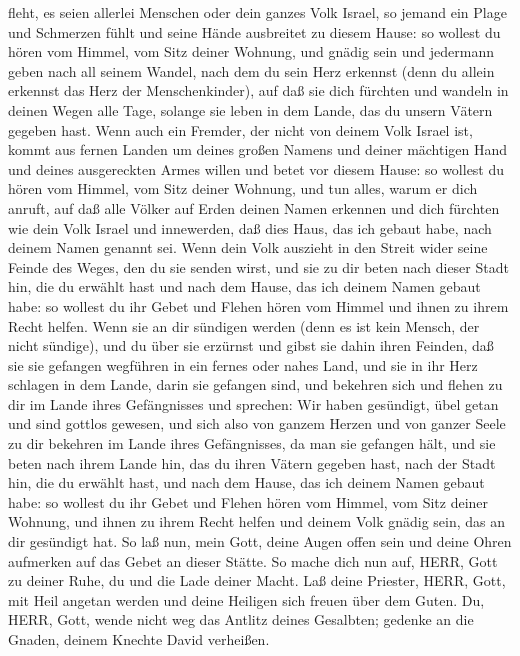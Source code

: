 fleht, es seien allerlei Menschen oder dein ganzes Volk Israel, so
jemand ein Plage und Schmerzen fühlt und seine Hände ausbreitet zu
diesem Hause:  so wollest du hören vom Himmel, vom Sitz
deiner Wohnung, und gnädig sein und jedermann geben nach all seinem
Wandel, nach dem du sein Herz erkennst (denn du allein erkennst das Herz
der Menschenkinder),  auf daß sie dich fürchten und wandeln
in deinen Wegen alle Tage, solange sie leben in dem Lande, das du unsern
Vätern gegeben hast.  Wenn auch ein Fremder, der nicht von
deinem Volk Israel ist, kommt aus fernen Landen um deines großen Namens
und deiner mächtigen Hand und deines ausgereckten Armes willen und betet
vor diesem Hause:  so wollest du hören vom Himmel, vom Sitz
deiner Wohnung, und tun alles, warum er dich anruft, auf daß alle Völker
auf Erden deinen Namen erkennen und dich fürchten wie dein Volk Israel
und innewerden, daß dies Haus, das ich gebaut habe, nach deinem Namen
genannt sei.  Wenn dein Volk auszieht in den Streit wider
seine Feinde des Weges, den du sie senden wirst, und sie zu dir beten
nach dieser Stadt hin, die du erwählt hast und nach dem Hause, das ich
deinem Namen gebaut habe:  so wollest du ihr Gebet und
Flehen hören vom Himmel und ihnen zu ihrem Recht helfen. 
Wenn sie an dir sündigen werden (denn es ist kein Mensch, der nicht
sündige), und du über sie erzürnst und gibst sie dahin ihren Feinden,
daß sie sie gefangen wegführen in ein fernes oder nahes Land,
 und sie in ihr Herz schlagen in dem Lande, darin sie
gefangen sind, und bekehren sich und flehen zu dir im Lande ihres
Gefängnisses und sprechen: Wir haben gesündigt, übel getan und sind
gottlos gewesen,  und sich also von ganzem Herzen und von
ganzer Seele zu dir bekehren im Lande ihres Gefängnisses, da man sie
gefangen hält, und sie beten nach ihrem Lande hin, das du ihren Vätern
gegeben hast, nach der Stadt hin, die du erwählt hast, und nach dem
Hause, das ich deinem Namen gebaut habe:  so wollest du ihr
Gebet und Flehen hören vom Himmel, vom Sitz deiner Wohnung, und ihnen zu
ihrem Recht helfen und deinem Volk gnädig sein, das an dir gesündigt
hat.  So laß nun, mein Gott, deine Augen offen sein und
deine Ohren aufmerken auf das Gebet an dieser Stätte.  So
mache dich nun auf, HERR, Gott zu deiner Ruhe, du und die Lade deiner
Macht. Laß deine Priester, HERR, Gott, mit Heil angetan werden und deine
Heiligen sich freuen über dem Guten.  Du, HERR, Gott, wende
nicht weg das Antlitz deines Gesalbten; gedenke an die Gnaden, deinem
Knechte David verheißen.

